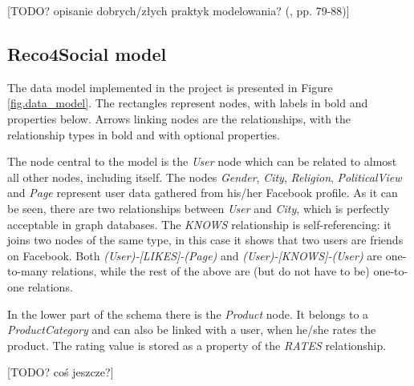\documentclass[12pt]{report}
\begin{document}
[TODO? opisanie dobrych/złych praktyk modelowania? (\cite{learning_neo4j}, pp. 79-88)]

\subsection{Reco4Social model}

The data model implemented in the project is presented in Figure \ref{fig.data_model}. The rectangles represent nodes, with labels in bold and properties below. Arrows linking nodes are the relationships, with the relationship types in bold and with optional properties.

The node central to the model is the \textit{User} node which can be related to almost all other nodes, including itself. The nodes \textit{Gender}, \textit{City}, \textit{Religion}, \textit{PoliticalView} and \textit{Page} represent user data gathered from his/her Facebook profile. As it can be seen, there are two relationships between \textit{User} and \textit{City}, which is perfectly acceptable in graph databases. The \textit{KNOWS} relationship is self-referencing: it joins two nodes of the same type, in this case it shows that two users are friends on Facebook. Both \textit{(User)-[LIKES]-(Page)} and \textit{(User)-[KNOWS]-(User)} are one-to-many relations, while the rest of the above are (but do not have to be) one-to-one relations.

In the lower part of the schema there is the \textit{Product} node. It belongs to a \textit{ProductCategory} and can also be linked with a user, when he/she rates the product. The rating value is stored as a property of the \textit{RATES} relationship. 

[TODO? coś jeszcze?]
\end{document}
